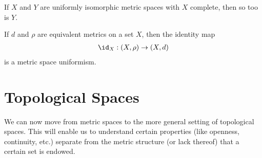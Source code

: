 \begin{fact}
  If $X$ and $Y$ are uniformly isomorphic metric spaces with $X$ complete, then so too is $Y$.\newline

  If $d$ and $\rho$ are equivalent metrics on a set $X$, then the identity map
  \begin{align*}
    \id_{X}:\left(X,\rho\right)\rightarrow \left(X,d\right)
  \end{align*}
  is a metric space uniformism.
\end{fact}
\section{Topological Spaces}%
We can now move from metric spaces to the more general setting of topological spaces. This will enable us to understand certain properties (like openness, continuity, etc.) separate from the metric structure (or lack thereof) that a certain set is endowed.

